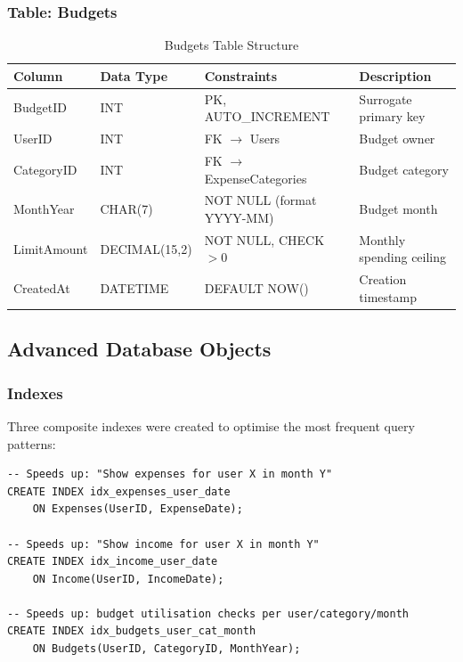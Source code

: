 \documentclass[12pt, a4paper]{article}
\begin{document}
\subsubsection{Table: Budgets}
\begin{table}[H]
\centering
\caption{Budgets Table Structure}
\begin{tabularx}{\textwidth}{lllX}
\toprule
\textbf{Column} & \textbf{Data Type} & \textbf{Constraints} & \textbf{Description} \\
\midrule
BudgetID    & INT           & PK, AUTO\_INCREMENT        & Surrogate primary key \\
UserID      & INT           & FK $\to$ Users             & Budget owner \\
CategoryID  & INT           & FK $\to$ ExpenseCategories & Budget category \\
MonthYear   & CHAR(7)       & NOT NULL (format YYYY-MM)  & Budget month \\
LimitAmount & DECIMAL(15,2) & NOT NULL, CHECK $>0$       & Monthly spending ceiling \\
CreatedAt   & DATETIME      & DEFAULT NOW()              & Creation timestamp \\
\bottomrule
\end{tabularx}
\end{table}

\subsection{Advanced Database Objects}

\subsubsection{Indexes}

Three composite indexes were created to optimise the most frequent query patterns:

\begin{lstlisting}[style=sqlstyle, caption={Index Definitions}]
-- Speeds up: "Show expenses for user X in month Y"
CREATE INDEX idx_expenses_user_date
    ON Expenses(UserID, ExpenseDate);

-- Speeds up: "Show income for user X in month Y"
CREATE INDEX idx_income_user_date
    ON Income(UserID, IncomeDate);

-- Speeds up: budget utilisation checks per user/category/month
CREATE INDEX idx_budgets_user_cat_month
    ON Budgets(UserID, CategoryID, MonthYear);
\end{lstlisting}
\end{document}
